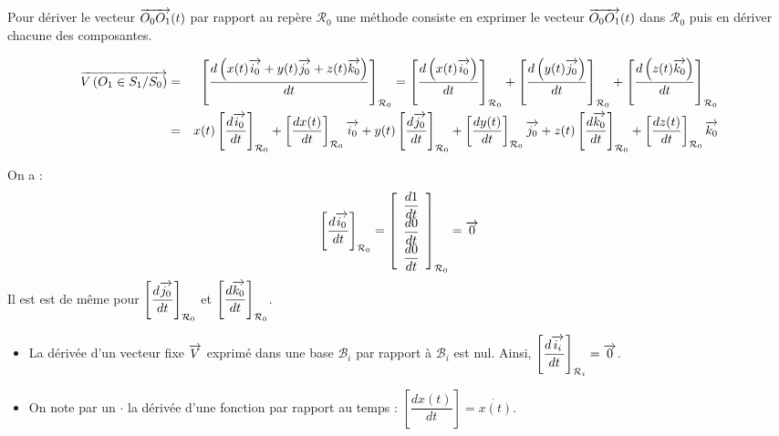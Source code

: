 \documentclass[10pt,oneside]{article}
\begin{document}
\begin{rem}
Pour dériver le vecteur $\overrightarrow{O_0 O_1}(t)$ par rapport au repère $\mathcal{R}_0$ une méthode consiste en exprimer le vecteur $\overrightarrow{O_0 O_1}(t)$ dans $\mathcal{R}_0$ puis en dériver chacune des composantes. 
\end{rem}

\begin{eqnarray*}
\overrightarrow{V\left( {O_1} \in {S_1}/{S_0}\right)} &=&  
\left[\dfrac{d\left(x(t)\overrightarrow{i_0}+y(t)\overrightarrow{j_0}+z(t)\overrightarrow{k_0} \right)}{dt}\right]_{\mathcal{R}_0}
= 
\left[\dfrac{d\left(x(t)\overrightarrow{i_0}\right)}{dt}\right]_{\mathcal{R}_0}
+\left[\dfrac{d\left(y(t)\overrightarrow{j_0}\right)}{dt}\right]_{\mathcal{R}_0}
+\left[\dfrac{d\left(z(t)\overrightarrow{k_0}\right)}{dt}\right]_{\mathcal{R}_0} \\
&=&
x(t)\left[\dfrac{d\overrightarrow{i_0}}{dt}\right]_{\mathcal{R}_0}
+ \left[\dfrac{dx(t)}{dt}\right]_{\mathcal{R}_0} \overrightarrow{i_0}
+y(t)\left[\dfrac{d\overrightarrow{j_0}}{dt}\right]_{\mathcal{R}_0}
+ \left[\dfrac{dy(t)}{dt}\right]_{\mathcal{R}_0} \overrightarrow{j_0}
+z(t)\left[\dfrac{d\overrightarrow{k_0}}{dt}\right]_{\mathcal{R}_0}
+ \left[\dfrac{dz(t)}{dt}\right]_{\mathcal{R}_0} \overrightarrow{k_0} \\
\end{eqnarray*}

On a : 
$$
\left[\dfrac{d\overrightarrow{i_0}}{dt}\right]_{\mathcal{R}_0} = 
\left[
\begin{array}{c}
\dfrac{d 1}{dt}\\
\dfrac{d 0}{dt}\\
\dfrac{d  0}{dt}\\
\end{array}
\right]_{\mathcal{R}_0}
 = \overrightarrow{0}
$$
Il est est de même pour $\left[\dfrac{d\overrightarrow{j_0}}{dt}\right]_{\mathcal{R}_0}$ et $\left[\dfrac{d\overrightarrow{k_0}}{dt}\right]_{\mathcal{R}_0}$.

\begin{rem}
\begin{itemize}
\item La dérivée d'un vecteur fixe $\overrightarrow{V}$ exprimé dans une base $\mathcal{B}_i$ par rapport à $\mathcal{B}_i$ est nul. Ainsi,  $\left[\dfrac{d\overrightarrow{i_i}}{dt}\right]_{\mathcal{R}_i}=\overrightarrow{0}$.
\item On note par un $\cdot$ la dérivée d'une fonction par rapport au temps : $\left[\dfrac{dx(t)}{dt}\right] = \dot{x(t)}$.
\end{itemize}

\end{rem}
\end{document}
